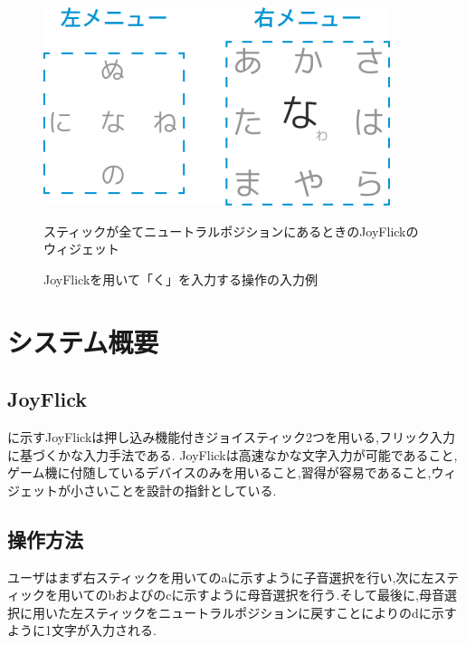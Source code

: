 \documentclass[uplatex]{jsarticle}
\begin{document}
\begin{figure}[tb]
  \centering
  \includegraphics[width=0.7\linewidth]{fig/JoyFlick_menu.png}
  \caption{スティックが全てニュートラルポジションにあるときのJoyFlickのウィジェット}
  \label{fig:JoyFlick}
  \caption{JoyFlickを用いて「く」を入力する操作の入力例}
  \label{fig:JoyFlick_abcd}
\end{figure}

\section{システム概要}
\subsection{JoyFlick}
に示すJoyFlickは押し込み機能付きジョイスティック2つを用いる,フリック入力に基づくかな入力手法である.
JoyFlickは高速なかな文字入力が可能であること,ゲーム機に付随しているデバイスのみを用いること,習得が容易であること,ウィジェットが小さいことを設計の指針としている.

\subsection{操作方法}
ユーザはまず右スティックを用いてのaに示すように子音選択を行い,次に左スティックを用いてのbおよびのcに示すように母音選択を行う.そして最後に,母音選択に用いた左スティックをニュートラルポジションに戻すことによりのdに示すように1文字が入力される.
\end{document}
